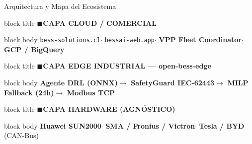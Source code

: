 \documentclass[10pt,aspectratio=169]{beamer}
\begin{document}
\begin{frame}{Arquitectura y Mapa del Ecosistema}
  \vspace{0.2cm}
  \begin{beamercolorbox}[wd=\textwidth, rounded=true, sep=5pt]{block title}
    \centering\small\textbf{\textcolor{blue!50}{$\blacksquare$\enspace CAPA CLOUD / COMERCIAL}}
  \end{beamercolorbox}
  \begin{beamercolorbox}[wd=\textwidth, sep=5pt]{block body}
    \centering\footnotesize
    \texttt{bess-solutions.cl}\enspace$\cdot$\enspace
    \texttt{bessai-web.app}\enspace$\cdot$\enspace
    \textbf{VPP Fleet Coordinator}\enspace$\cdot$\enspace
    \textbf{GCP / BigQuery}
  \end{beamercolorbox}
  \vspace{0.1cm}
  \vspace{0.1cm}
  \begin{beamercolorbox}[wd=\textwidth, rounded=true, sep=5pt]{block title}
    \centering\small\textbf{\textcolor{greenok}{$\blacksquare$\enspace CAPA EDGE INDUSTRIAL — open-bess-edge}}
  \end{beamercolorbox}
  \begin{beamercolorbox}[wd=\textwidth, sep=5pt]{block body}
    \centering\footnotesize
    \textbf{Agente DRL (ONNX)}\enspace$\rightarrow$\enspace
    \textbf{SafetyGuard IEC-62443}\enspace$\rightarrow$\enspace
    \textbf{MILP Fallback (24h)}\enspace$\rightarrow$\enspace
    \textbf{Modbus TCP}
  \end{beamercolorbox}
  \vspace{0.1cm}
  \vspace{0.1cm}
  \begin{beamercolorbox}[wd=\textwidth, rounded=true, sep=5pt]{block title}
    \centering\small\textbf{\textcolor{accentorange}{$\blacksquare$\enspace CAPA HARDWARE (AGN\'OSTICO)}}
  \end{beamercolorbox}
  \begin{beamercolorbox}[wd=\textwidth, sep=5pt]{block body}
    \centering\footnotesize
    \textbf{Huawei SUN2000}\enspace$\cdot$\enspace
    \textbf{SMA / Fronius / Victron}\enspace$\cdot$\enspace
    \textbf{Tesla / BYD} (CAN-Bus)
  \end{beamercolorbox}
\end{frame}
\end{document}
